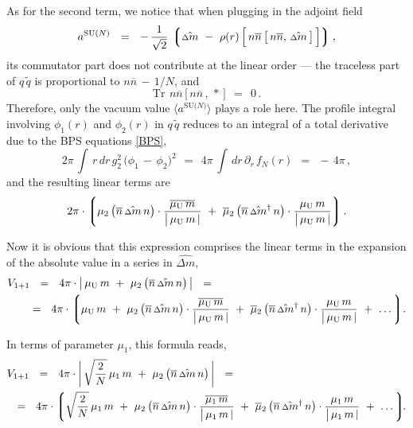 \documentclass[12pt]{article}
\def\beq{\begin{equation}}
\def\eeq{\end{equation}}
\newcommand{\p}{\partial}
\newcommand{\wt}{\widetilde}
\newcommand{\ov}{\overline}
\newcommand{\lgr}{\left\lgroup}
\newcommand{\rgr}{\right\rgroup}
\newcommand{\aN}{a^\text{SU($N$)}}
\newcommand{\nbar}{\ov{n}}
\newcommand{\nnbar}{n\ov{n}}
\newcommand{\muU}{\mu_\text{U}}
\newcommand{\qt}{\wt{q}}
\newcommand{\Tr}{\text{Tr}}
\newcommand{\dm}{\hat{{\scriptstyle \Delta} m}}
\newcommand{\dmdag}{\hat{{\scriptstyle \Delta} m}{}^\dag}
\begin{document}
	As for the second term, we notice that when plugging in the adjoint field 
\[
	\aN    ~~=~~    
	-\, \frac{1}{\sqrt{2}}\, 
	\lgr \dm  ~-~  \rho(r)\, \Big[\, \nnbar\, \big[\, \nnbar,\, \dm \,\big] \,\Big] \rgr,
\]
	its commutator part does not contribute at the linear order --- 
	the traceless part of $ q\, \qt $ is proportional to $ \nnbar \,-\, 1/N $, and
\[
	\Tr~\, \nnbar \, \big[\, \nnbar \,,\, * \,\big]    ~~=~~    0\,.
\]
	Therefore, only the vacuum value $ \langle \aN \rangle $ plays a role here.
	The profile integral involving $ \phi_1(r) $ and $ \phi_2(r) $ in $ q\, \qt $
	reduces to an integral of a total derivative due to the BPS equations \eqref{BPS},
\[
	2\pi\, \int\, r\, dr\, g_2^2\, \big( \phi_1 \,-\, \phi_2 \big)^2    ~~=~~
	4\pi\, \int\, dr\, \p_r\, f_N(r)    ~~=~~    -\, 4\pi\,,
\] 
	and the resulting linear terms are   
\beq
	2\pi \cdot 
	\lgr
		\mu_2\, \big(\nbar\, \dm\, n\big) \cdot \frac{\ov{\muU\, m}}{\big|\, \muU\, m \,|}
		~+~
		\ov{\mu}{}_2\, \big(\nbar\, \dmdag\, n\big) \cdot \frac{\muU\, m}{\big|\, \muU\, m \,|}
	\rgr.
\eeq

	Now it is obvious that this expression comprises the linear terms in the expansion of
	the absolute value in a series in $ \dm $,
\begin{align}
%
	&
	V_{1+1}    ~~=~~    4 \pi \cdot \big|\, \muU\, m  ~+~  \mu_2\, \big(\nbar\, \dm\, n\big) \,\big|    ~~=~~    
	\\
%
\notag
	&
	\quad~
	~~=~~
	4 \pi \cdot 
	\lgr
		\muU\, m  
		~+~
		\mu_2\, \big(\nbar\, \dm\, n\big) \cdot \frac{\ov{\muU\, m}}{\big|\, \muU\, m \,|}
		~+~
		\ov{\mu}{}_2\, \big(\nbar\, \dmdag\, n\big) \cdot \frac{\muU\, m}{\big|\, \muU\, m \,|}
		~+~
		\dots
	\rgr\!.
\end{align}

	In terms of parameter $ \mu_1 $, this formula reads,
\begin{align}
%
	&
	V_{1+1}    ~~=~~    4 \pi \cdot \bigg|\, \sqrt{\frac{2}{N}}\,\mu_1\, m  ~+~  \mu_2\, \big(\nbar\, \dm\, n\big) \,\bigg|    ~~=~~    
	\\
%
\notag
	&
	~~=~~
	4 \pi \cdot 
	\lgr
		\sqrt{\frac{2}{N}}\,\mu_1\, m  
		~+~
		\mu_2\, \big(\nbar\, \dm\, n\big) \cdot \frac{\ov{\mu_1\, m}}{\big|\, \mu_1\, m \,|}
		~+~
		\ov{\mu}{}_2\, \big(\nbar\, \dmdag\, n\big) \cdot \frac{\mu_1\, m}{\big|\, \mu_1\, m \,|}
		~+~
		\dots
	\rgr\!\!.
\end{align}
\end{document}
